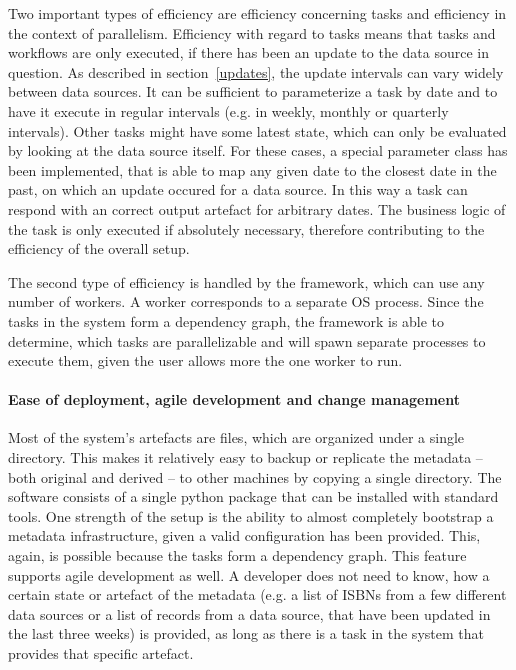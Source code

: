 \documentclass[english]{lni}
\begin{document}
Two important types of efficiency are efficiency
concerning tasks and efficiency in the context of parallelism. Efficiency
with regard to tasks means that tasks and workflows are only executed,
if there has been an update to the data source in question. As described
in section~\ref{updates}, the update intervals can vary widely between data sources.
It can be sufficient to parameterize a task by date and to have it
execute in regular intervals (e.g. in weekly, monthly or quarterly intervals).
Other tasks might have some latest state, which can only be evaluated
by looking at the data source itself. For these cases, a special parameter
class has been implemented, that is able to map any given date to the closest
date in the past, on which an update occured for a data source. In this way a task can
respond with an correct output artefact for arbitrary dates. The business logic of the task
is only executed if absolutely necessary, therefore contributing to the efficiency of the overall
setup.

The second type of efficiency is handled by the framework, which can use any
number of workers. A worker corresponds to a separate OS process. Since the tasks
in the system form a dependency graph, the framework is able to determine,
which tasks are parallelizable and will spawn separate processes to execute them, given the user allows
more the one worker to run.

\paragraph{Ease of deployment, agile development and change management}
\label{ease}

Most of the system's artefacts are files, which are organized under a single
directory. This makes it relatively easy to backup or replicate the metadata --
both original and derived -- to other machines by copying a single directory.
The software consists of a single python package that can be installed with
standard tools. One strength of the setup is the ability to almost
completely bootstrap a metadata infrastructure, given a valid configuration
has been provided. This, again, is possible because the tasks form a dependency graph.
This feature supports agile development as well. A developer does not
need to know, how a certain state or artefact of the metadata (e.g. a list
of ISBNs from a few different data sources or a list of records from a data source,
that have been updated in the last three weeks) is provided, as long as there
is a task in the system that provides that specific artefact.
\end{document}
